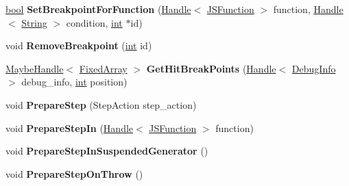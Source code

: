 \begin{DoxyCompactItemize}
\item 
\mbox{\label{classv8_1_1internal_1_1Debug_a3ac7dd38b42d41c3670628b49c946bd6}} 
\mbox{\hyperlink{classbool}{bool}} {\bfseries Set\+Breakpoint\+For\+Function} (\mbox{\hyperlink{classv8_1_1internal_1_1Handle}{Handle}}$<$ \mbox{\hyperlink{classv8_1_1internal_1_1JSFunction}{J\+S\+Function}} $>$ function, \mbox{\hyperlink{classv8_1_1internal_1_1Handle}{Handle}}$<$ \mbox{\hyperlink{classv8_1_1internal_1_1String}{String}} $>$ condition, \mbox{\hyperlink{classint}{int}} $\ast$id)
\item 
\mbox{\label{classv8_1_1internal_1_1Debug_a6d40f78fa7f2a76eab8cb9244e7fa5c1}} 
void {\bfseries Remove\+Breakpoint} (\mbox{\hyperlink{classint}{int}} id)
\item 
\mbox{\label{classv8_1_1internal_1_1Debug_ae8f58a0655b87af0185f1cfd49223af0}} 
\mbox{\hyperlink{classv8_1_1internal_1_1MaybeHandle}{Maybe\+Handle}}$<$ \mbox{\hyperlink{classv8_1_1internal_1_1FixedArray}{Fixed\+Array}} $>$ {\bfseries Get\+Hit\+Break\+Points} (\mbox{\hyperlink{classv8_1_1internal_1_1Handle}{Handle}}$<$ \mbox{\hyperlink{classv8_1_1internal_1_1DebugInfo}{Debug\+Info}} $>$ debug\+\_\+info, \mbox{\hyperlink{classint}{int}} position)
\item 
\mbox{\label{classv8_1_1internal_1_1Debug_a1872132362358cdade44b99095d8f97f}} 
void {\bfseries Prepare\+Step} (Step\+Action step\+\_\+action)
\item 
\mbox{\label{classv8_1_1internal_1_1Debug_a3dc6802fb68825df1a2322933fd452b2}} 
void {\bfseries Prepare\+Step\+In} (\mbox{\hyperlink{classv8_1_1internal_1_1Handle}{Handle}}$<$ \mbox{\hyperlink{classv8_1_1internal_1_1JSFunction}{J\+S\+Function}} $>$ function)
\item 
\mbox{\label{classv8_1_1internal_1_1Debug_a3d8af8aa938b899207eb095fa69c4b64}} 
void {\bfseries Prepare\+Step\+In\+Suspended\+Generator} ()
\item 
\mbox{\label{classv8_1_1internal_1_1Debug_aca9a11794cd471939698acde5a1ab7d4}} 
void {\bfseries Prepare\+Step\+On\+Throw} ()

\end{DoxyCompactItemize}
